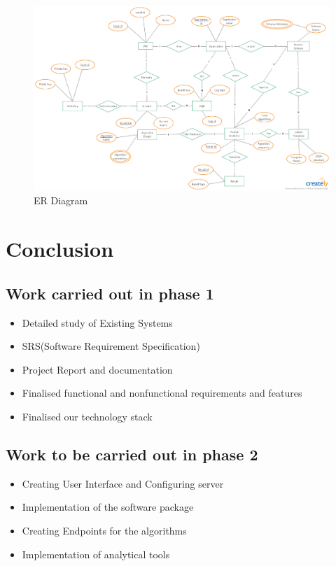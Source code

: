 \documentclass[a4paper,12pt]{report}
\begin{document}
    \begin{figure}[h]
      \includegraphics[width=8.5in ,angle=90]{ER.jpg}
      \caption{ ER Diagram}  
    \end{figure}

    \chapter {Conclusion}
    \section{Work carried out in phase 1}
    \begin{itemize}
      \item  Detailed study of Existing Systems
      \item  SRS(Software Requirement Specification)
      \item  Project Report and documentation
      \item  Finalised functional and nonfunctional requirements and features
      \item  Finalised our technology stack
    \end{itemize}
    \section{Work to be carried out in phase 2}
    \begin{itemize}
      \item  Creating User Interface and Configuring server
      \item  Implementation of the software package
      \item  Creating Endpoints for the algorithms
      \item  Implementation of analytical tools 
    \end{itemize}    
    
\end{document}
